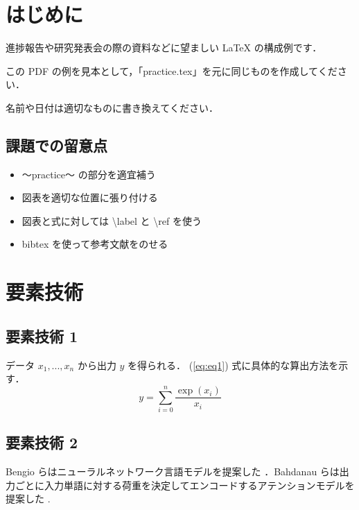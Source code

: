 \documentclass[twocolumn]{jarticle}     %
\begin{document}

\section{はじめに}
進捗報告や研究発表会の際の資料などに望ましい LaTeX の構成例です．\par
この PDF の例を見本として，「practice.tex」を元に同じものを作成してください．\par
名前や日付は適切なものに書き換えてください．

\subsection{課題での留意点}

\begin{itemize}
\item 〜practice〜 の部分を適宜補う
\item 図表を適切な位置に張り付ける
\item 図表と式に対しては \textbackslash label と \textbackslash ref を使う
\item bibtex を使って参考文献をのせる
\end{itemize}

\section{要素技術}

\subsection{要素技術 1}
データ $x_1, ..., x_n$ から出力 $y$ を得られる．
(\ref{eq:eq1}) 式に具体的な算出方法を示す．
	\begin{equation}
		y=\sum_{i=0}^{n} \frac{\exp{(x_i)}}{x_i}
	\label{eq:eq1}
	\end{equation}


\subsection{要素技術 2}
Bengio らはニューラルネットワーク言語モデルを提案した \cite{FFNN}．Bahdanau らは出力ごとに入力単語に対する荷重を決定してエンコードするアテンションモデルを提案した \cite{translate}.
\end{document}
